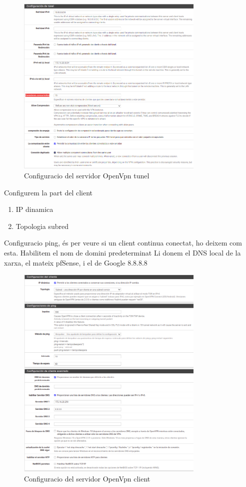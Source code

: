 \documentclass[
  10pt,
]{krantz}
\providecommand{\tightlist}{%
  \setlength{\itemsep}{0pt}\setlength{\parskip}{0pt}}
\begin{document}
\begin{figure}
\centering
\includegraphics[width=0.8\textwidth,height=\textheight]{imatges/proxmox/Conf_vpn_server3.png}
\caption{Configuracio del servidor OpenVpn tunel}
\end{figure}

Configurem la part del client

\begin{enumerate}
\def\labelenumi{\arabic{enumi}.}
\tightlist
\item
  IP dinamica
\item
  Topologia subred
\end{enumerate}

Configuracio ping, és per veure si un client continua conectat, ho deixem com esta. Habilitem el nom de domini predeterminat Li donem el DNS local de la xarxa, el mateix pfSense, i el de Google 8.8.8.8

\begin{figure}
\centering
\includegraphics[width=0.8\textwidth,height=\textheight]{imatges/proxmox/Conf_vpn_server4.png}
\caption{Configuracio del servidor OpenVpn client}
\end{figure}
\end{document}
